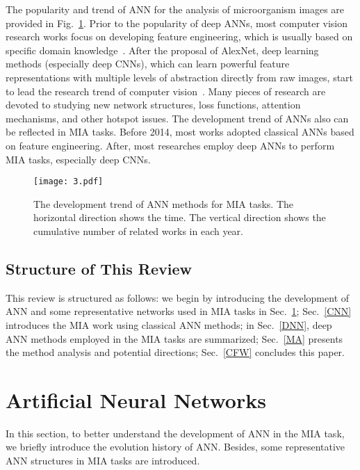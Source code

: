 The popularity and trend of ANN for the analysis of microorganism images are provided in Fig.~\ref{fig3}. Prior to the popularity of deep ANNs, most computer vision research works focus on developing feature engineering, which is usually based on specific domain knowledge~\cite{Liu-2020-DLGO}. After the proposal of AlexNet, deep learning methods (especially deep CNNs), which can learn powerful feature representations with multiple levels of abstraction directly from raw images, start to lead the research trend of computer vision~\cite{Liu-2020-DLGO}. Many pieces of research are devoted to studying new network structures, loss functions, attention mechanisms, and other hotspot issues. The development trend of ANNs also can be reflected in MIA tasks. Before 2014, most works adopted classical ANNs based on feature engineering. After, most researches employ deep ANNs to perform MIA tasks, especially deep CNNs.

\begin{figure}[htbp!]
\centering
\texttt{[image: 3.pdf]}
\caption{The development trend of ANN methods for MIA tasks. The horizontal direction shows the time. The vertical direction shows the cumulative number of related works in each year.}
\label{fig3}
\end{figure}


\subsection{Structure of This Review}
This review is structured as follows: we begin by introducing the development of ANN and some representative networks used in MIA tasks in Sec.~\ref{ANN}; Sec.~\ref{CNN} introduces the MIA work using classical ANN methods; in Sec.~\ref{DNN}, deep ANN methods employed in the MIA tasks are summarized; Sec.~\ref{MA} presents the method analysis and potential directions; Sec.~\ref{CFW} concludes this paper.

\section{Artificial Neural Networks}
\label{ANN}

In this section, to better understand the development of ANN in the MIA task, we briefly introduce the evolution history of ANN. Besides, some representative ANN structures in MIA tasks are introduced.


